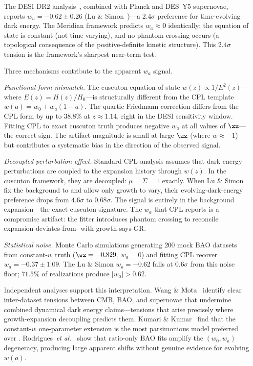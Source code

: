 The DESI DR2 analysis~\cite{ch1:desi25}, combined with Planck and
DES~Y5 supernovae, reports $w_a = -0.62 \pm 0.26$
(Lu \& Simon~\cite{ch2:LuSimon2026})---a $2.4\sigma$ preference for
time-evolving dark energy. The Meridian framework predicts
$w_a \approx 0$ identically: the equation of state is constant (not
time-varying), and no phantom crossing occurs (a topological
consequence of the positive-definite kinetic structure). This
$2.4\sigma$ tension is the framework's sharpest near-term test.

Three mechanisms contribute to the apparent $w_a$ signal.

\textit{Functional-form mismatch.} The cuscuton equation of state
$w(z) \propto 1/E^2(z)$---where $E(z) = H(z)/H_0$---is structurally
different from the CPL template $w(a) = w_0 + w_a(1 - a)$. The quartic
Friedmann correction differs from the CPL form by up to $38.8\%$ at
$z \approx 1.14$, right in the DESI sensitivity window. Fitting CPL to
exact cuscuton truth produces negative $w_a$ at all values of $\zz$---
the correct sign. The artifact magnitude is small at large $\zz$ (where
$w \approx -1$) but contributes a systematic bias in the direction of
the observed signal.

\textit{Decoupled perturbation effect.} Standard CPL analysis assumes
that dark energy perturbations are coupled to the expansion history
through $w(z)$. In the cuscuton framework, they are decoupled:
$\mu = \Sigma = 1$ exactly. When Lu \& Simon fix the background to
\LCDM{} and allow only growth to vary, their evolving-dark-energy
preference drops from $4.6\sigma$ to $0.68\sigma$. The signal is
entirely in the background expansion---the exact cuscuton signature.
The $w_a$ that CPL reports is a compromise artifact: the fitter
introduces phantom crossing to reconcile expansion-deviates-from-\LCDM{}
with growth-says-GR.

\textit{Statistical noise.} Monte Carlo simulations generating 200
mock BAO datasets from constant-$w$ truth ($\wz = -0.829$, $w_a = 0$)
and fitting CPL recover $w_a = -0.37 \pm 1.09$. The Lu \& Simon
$w_a = -0.62$ falls at $0.6\sigma$ from this noise floor; $71.5\%$ of
realizations produce $|w_a| > 0.62$.

Independent analyses support this interpretation. Wang \&
Mota~\cite{ch2:WangMota2025} identify clear inter-dataset tensions
between CMB, BAO, and supernovae that undermine combined dynamical
dark energy claims---tensions that arise precisely where
growth-expansion decoupling predicts them. Kumari \&
Kumar~\cite{ch2:KumariKumar2026} find that the constant-$w$
one-parameter extension is the most parsimonious model preferred over
\LCDM. Rodrigues~\textit{et al.}~\cite{ch2:Rodrigues2025} show that
ratio-only BAO fits amplify the $(w_0, w_a)$ degeneracy, producing
large apparent shifts without genuine evidence for evolving $w(a)$.

